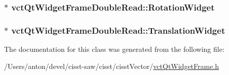 \subsubsection[{Rotation\+Widget}]{$\ast$ vct\+Qt\+Widget\+Frame\+Double\+Read\+::\+Rotation\+Widget\hspace{0.3cm}{\ttfamily [protected]}}\label{classvct_qt_widget_frame_double_read_a7044426a9061234c402ba1ce2f64113d}
\hypertarget{classvct_qt_widget_frame_double_read_a2795e93ee9010d34c7e5af32f555ecdd}{}
\subsubsection[{Translation\+Widget}]{$\ast$ vct\+Qt\+Widget\+Frame\+Double\+Read\+::\+Translation\+Widget\hspace{0.3cm}{\ttfamily [protected]}}\label{classvct_qt_widget_frame_double_read_a2795e93ee9010d34c7e5af32f555ecdd}


The documentation for this class was generated from the following file\+:\begin{DoxyCompactItemize}
\item 
/\+Users/anton/devel/cisst-\/saw/cisst/cisst\+Vector/\hyperlink{vct_qt_widget_frame_8h}{vct\+Qt\+Widget\+Frame.\+h}\end{DoxyCompactItemize}
